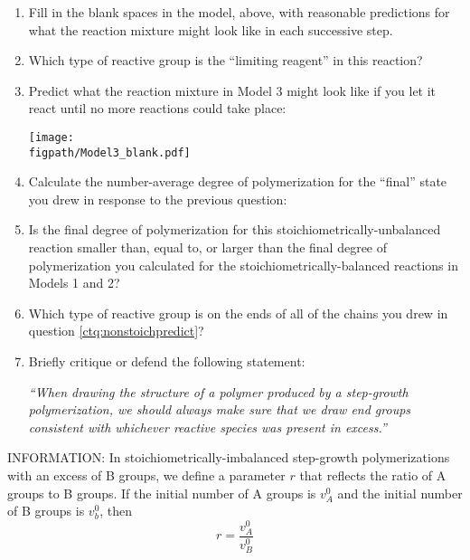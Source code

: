 	\begin{enumerate}[resume]
		\item Fill in the blank spaces in the model, above, with reasonable predictions for what the reaction mixture might look like in each successive step.
		
		\item Which type of reactive group is the ``limiting reagent'' in this reaction?
		
		\item \label{ctq:nonstoichpredict} Predict what the reaction mixture in Model 3 might look like if you let it react until no more reactions could take place:
		
\vspace{0.1in}
\centerline{\texttt{[image: \\figpath/Model3\_blank.pdf]}}
		
		\item Calculate the number-average degree of polymerization for the ``final'' state you drew in response to the previous question:
		
		\vspace{1in}
		
		\item Is the final degree of polymerization for this stoichiometrically-unbalanced reaction smaller than, equal to, or larger than the final degree of polymerization you calculated for the stoichiometrically-balanced reactions in Models 1 and 2?
		
		\vspace{0.5in}
		
		\item Which type of reactive group is on the ends of all of the chains you drew in question \ref{ctq:nonstoichpredict}?
		
		\vspace{0.5in}
		
		\item Briefly critique or defend the following statement:
		
			\emph{``When drawing the structure of a polymer produced by a step-growth polymerization, we should always make sure that we draw end groups consistent with whichever reactive species was present in excess.''}
		
		\vspace{1in}
			
	\end{enumerate}
	
	INFORMATION: In stoichiometrically-imbalanced step-growth polymerizations with an excess of B groups, we define a parameter $r$ that reflects the ratio of A groups to B groups.	
	If the initial number of A groups is $v_A^0$ and the initial number of B groups is $v_b^0$, then
	\begin{equation*}
		r = \frac{v_A^0}{v_B^0}
	\end{equation*}
	
